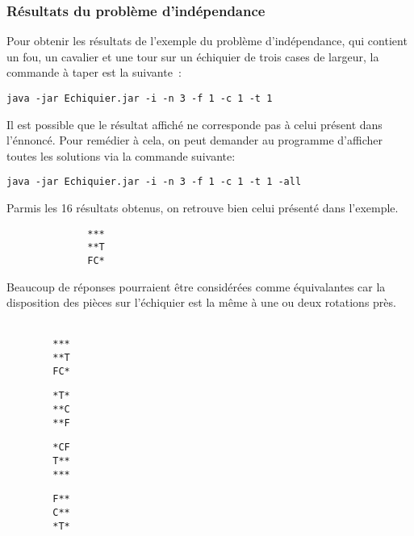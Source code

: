 \documentclass[a4paper,11pt]{article}
\begin{document}
        \subsubsection{Résultats du problème d'indépendance}
        	Pour obtenir les résultats de l'exemple du problème d'indépendance, qui contient un fou, un cavalier et une tour sur un échiquier de trois cases de largeur, la commande à taper est la suivante~:
            \begin{verbatim}
java -jar Echiquier.jar -i -n 3 -f 1 -c 1 -t 1
            \end{verbatim}
            Il est possible que le résultat affiché ne corresponde pas à celui présent dans l'énnoncé.  Pour remédier à cela, on peut demander au programme d'afficher toutes les solutions via la commande suivante:
            \begin{verbatim}
java -jar Echiquier.jar -i -n 3 -f 1 -c 1 -t 1 -all
            \end{verbatim}
            Parmis les 16 résultats obtenus, on retrouve bien celui présenté dans l'exemple.
            \begin{verbatim}
              ***
              **T
              FC*
            \end{verbatim}
            \begin{tcolorbox}[title=Remarques :]
            	Beaucoup de réponses pourraient être considérées comme équivalantes car la disposition des pièces sur l'échiquier est la même à une ou deux rotations près.\\\\
                \begin{minipage}{.2\linewidth}
                  \begin{verbatim}
        ***
        **T
        FC*
                  \end{verbatim}
                \end{minipage}
                \hfill
                \begin{minipage}{.2\linewidth}
                  \begin{verbatim}
        *T*
        **C
        **F
                  \end{verbatim}
                \end{minipage}
                \hfill
                \begin{minipage}{.2\linewidth}
                  \centering
                  \begin{verbatim}
        *CF
        T**
        ***
                  \end{verbatim}
                \end{minipage}
                \hfill
                \begin{minipage}{.2\linewidth}
                  \centering
                  \begin{verbatim}
        F**
        C**
        *T*
                  \end{verbatim}
                \end{minipage}
            \end{tcolorbox}
\end{document}
